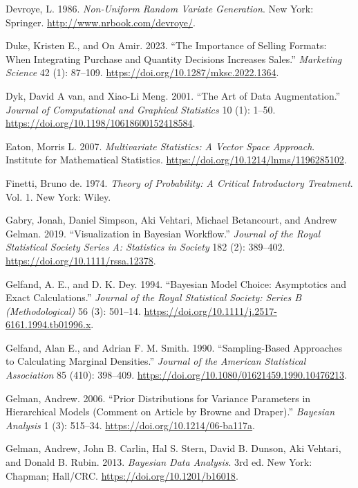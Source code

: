 \documentclass[
  11pt,
  letterpaper,
]{scrbook}
\newlength{\cslhangindent}
\newenvironment{CSLReferences}[2] %
 {\begin{list}{}{%
  \setlength{\itemindent}{0pt}
  \setlength{\leftmargin}{0pt}
  \setlength{\parsep}{0pt}
  \ifodd #1
   \setlength{\leftmargin}{\cslhangindent}
   \setlength{\itemindent}{-1\cslhangindent}
  \fi
  \setlength{\itemsep}{#2\baselineskip}}}
 {\end{list}}
\theoremstyle{plain}
\theoremstyle{plain}
\theoremstyle{definition}
\theoremstyle{definition}
\theoremstyle{definition}
\theoremstyle{plain}
\theoremstyle{remark}
\begin{document}
\begin{CSLReferences}{1}{0}
Devroye, L. 1986. \emph{Non-Uniform Random Variate Generation}. New
York: Springer. \url{http://www.nrbook.com/devroye/}.

Duke, Kristen E., and On Amir. 2023. {``The Importance of Selling
Formats: When Integrating Purchase and Quantity Decisions Increases
Sales.''} \emph{Marketing Science} 42 (1): 87--109.
\url{https://doi.org/10.1287/mksc.2022.1364}.

Dyk, David A van, and Xiao-Li Meng. 2001. {``The Art of Data
Augmentation.''} \emph{Journal of Computational and Graphical
Statistics} 10 (1): 1--50.
\url{https://doi.org/10.1198/10618600152418584}.

Eaton, Morris L. 2007. \emph{Multivariate Statistics: A Vector Space
Approach}. Institute for Mathematical Statistics.
\url{https://doi.org/10.1214/lnms/1196285102}.

Finetti, Bruno de. 1974. \emph{Theory of Probability: A Critical
Introductory Treatment}. Vol. 1. New York: Wiley.

Gabry, Jonah, Daniel Simpson, Aki Vehtari, Michael Betancourt, and
Andrew Gelman. 2019. {``{Visualization in {B}ayesian Workflow}.''}
\emph{Journal of the Royal Statistical Society Series A: Statistics in
Society} 182 (2): 389--402. \url{https://doi.org/10.1111/rssa.12378}.

Gelfand, A. E., and D. K. Dey. 1994. {``Bayesian Model Choice:
Asymptotics and Exact Calculations.''} \emph{Journal of the Royal
Statistical Society: Series B (Methodological)} 56 (3): 501--14.
\url{https://doi.org/10.1111/j.2517-6161.1994.tb01996.x}.

Gelfand, Alan E., and Adrian F. M. Smith. 1990. {``Sampling-Based
Approaches to Calculating Marginal Densities.''} \emph{Journal of the
American Statistical Association} 85 (410): 398--409.
\url{https://doi.org/10.1080/01621459.1990.10476213}.

Gelman, Andrew. 2006. {``Prior Distributions for Variance Parameters in
Hierarchical Models (Comment on Article by {B}rowne and {D}raper).''}
\emph{Bayesian Analysis} 1 (3): 515--34.
\url{https://doi.org/10.1214/06-ba117a}.

Gelman, Andrew, John B. Carlin, Hal S. Stern, David B. Dunson, Aki
Vehtari, and Donald B. Rubin. 2013. \emph{Bayesian Data Analysis}. 3rd
ed. New York: Chapman; Hall/CRC. \url{https://doi.org/10.1201/b16018}.


\end{CSLReferences}
\end{document}
